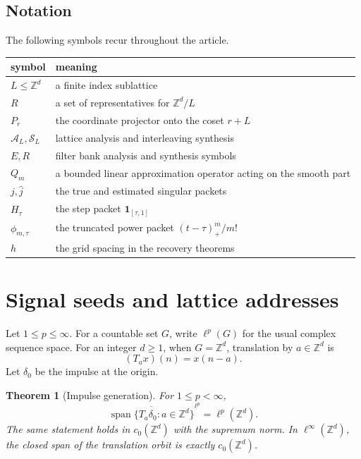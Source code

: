 \documentclass[11pt,a4paper]{article}
\newtheorem{theorem}{Theorem}[section]
\theoremstyle{definition}
\theoremstyle{remark}
\newcommand{\ZZ}{\mathbb Z}
\newcommand{\Acal}{\mathcal A}
\newcommand{\Scal}{\mathcal S}
\newcommand{\one}{\mathbf 1}
\newcommand{\Span}{\operatorname{span}}
\begin{document}
\subsection{Notation}

The following symbols recur throughout the article.
\begin{center}
\begin{tabular}{p{}p{}}
\toprule
symbol & meaning\\
\midrule
\(L\leq\ZZ^d\) & a finite index sublattice\\
\(R\) & a set of representatives for \(\ZZ^d/L\)\\
\(P_r\) & the coordinate projector onto the coset \(r+L\)\\
\(\Acal_L,\Scal_L\) & lattice analysis and interleaving synthesis\\
\(E,R\) & filter bank analysis and synthesis symbols\\
\(Q_m\) & a bounded linear approximation operator acting on the smooth part\\
\(j,\widehat j\) & the true and estimated singular packets\\
\(H_\tau\) & the step packet \(\one_{[\tau,1]}\)\\
\(\phi_{m,\tau}\) & the truncated power packet \((t-\tau)_+^m/m!\)\\
\(h\) & the grid spacing in the recovery theorems\\
\bottomrule
\end{tabular}
\end{center}

\section{Signal seeds and lattice addresses}\label{extension:section:02}\label{sec:signal_seeds}

Let \(1\leq p\leq\infty\). For a countable set \(G\), write \(\ell^p(G)\) for the usual complex sequence space. For an integer \(d\geq1\), when \(G=\ZZ^d\), translation by \(a\in\ZZ^d\) is
\[
(T_ax)(n)=x(n-a).
\]
Let \(\delta_0\) be the impulse at the origin.

\begin{theorem}[Impulse generation]\label{thm:impulse_generation}
For \(1\leq p<\infty\),
\[
\overline{\Span\{T_a\delta_0:a\in\ZZ^d\}}^{\ell^p}
=
\ell^p(\ZZ^d).
\]
The same statement holds in \(c_0(\ZZ^d)\) with the supremum norm. In \(\ell^\infty(\ZZ^d)\), the closed span of the translation orbit is exactly \(c_0(\ZZ^d)\).
\end{theorem}
\end{document}

